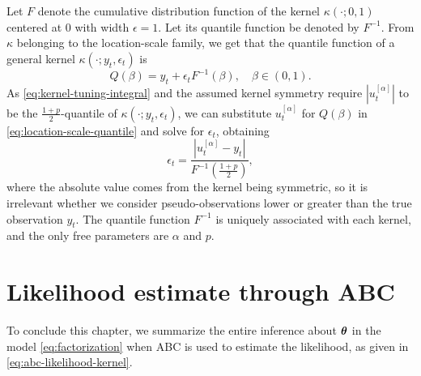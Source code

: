Let $F$ denote the cumulative distribution function of the kernel $\kappa(\cdot; 0, 1)$ centered at 0 with width $\epsilon = 1$. Let its quantile function be denoted by $F^{-1}$. From $\kappa$ belonging to the location-scale family, we get that the quantile function of a general kernel $\kappa(\cdot; y_t, \epsilon_t)$ is
\begin{equation} \label{eq:location-scale-quantile}
Q(\beta) = y_t + \epsilon_t F^{-1}(\beta), \quad \beta \in \left(0, 1\right).
\end{equation}
As \eqref{eq:kernel-tuning-integral} and the assumed kernel symmetry require $\left| u_t^{[\alpha]} \right|$ to be the $\frac{1+p}{2}$-quantile of $\kappa(\cdot; y_t, \epsilon_t)$, we can substitute $u_t^{[\alpha]}$ for $Q(\beta)$ in \eqref{eq:location-scale-quantile} and solve for $\epsilon_t$, obtaining
\begin{equation} \label{eq:kernel-tuning}
\epsilon_t = \frac{\left| u_t^{[\alpha]} - y_t \right|}{F^{-1}(\frac{1+p}{2})},
\end{equation}
where the absolute value comes from the kernel being symmetric, so it is irrelevant whether we consider pseudo-observations lower or greater than the true observation $y_t$. The quantile function $F^{-1}$ is uniquely associated with each kernel, and the only free parameters are $\alpha$ and $p$.


\section{Likelihood estimate through ABC} \label{sec:abcmh}
To conclude this chapter, we summarize the entire inference about $\bm{\theta}$ in the model \eqref{eq:factorization} when ABC is used to estimate the likelihood, as given in \autoref{eq:abc-likelihood-kernel}.

